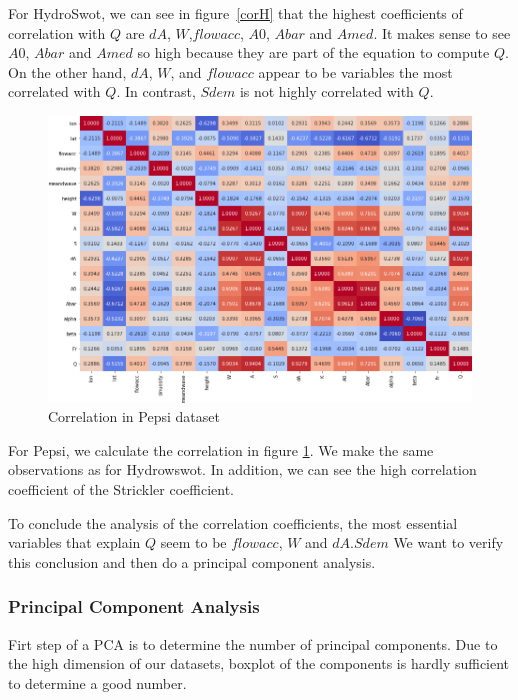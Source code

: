 For HydroSwot, we can see in figure~\ref{corH} that the highest coefficients of correlation with $Q$ are $dA$, $W$,$flowacc$, $A0$, $Abar$ and $Amed$. It makes sense to see $A0$, $Abar$ and $Amed$ so high because they are part of the equation to compute $Q$. On the other hand, $dA$, $W$, and $flowacc$ appear to be variables the most correlated with $Q$. In contrast, $Sdem$ is not highly correlated with $Q$.
\begin{figure}[H]
\centering
\includegraphics[scale=0.4]{Graph/correlation_pepsi.png}
\caption{Correlation in Pepsi dataset}
\label{fig:tab2}
\end{figure}

For Pepsi, we calculate the correlation in figure \ref{fig:tab2}. We make the same observations as for Hydrowswot. In addition, we can see the high correlation coefficient of the Strickler coefficient. 

To conclude the analysis of the correlation coefficients, the most essential variables that explain $Q$ seem to be $flowacc$, $W$ and $dA$.$Sdem$ We want to verify this conclusion and then do a principal component analysis. 

\subsubsection{Principal Component Analysis}

 Firt step of a PCA is to determine the number of principal components. Due to the high dimension of our datasets, boxplot of the components is hardly sufficient to determine a good number. 
 
